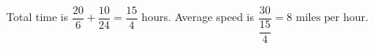 Total time is $\dfrac{20}{6}+\dfrac{10}{24}=\dfrac{15}{4}$ hours. Average speed is $\dfrac{30}{\dfrac{15}{4}}=\boxed{8\text{ miles per hour}}$.

